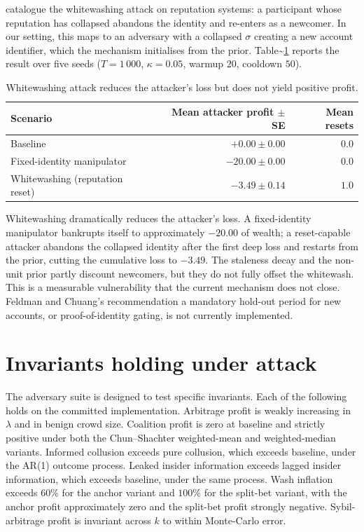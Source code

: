 \documentclass[
  11pt,
  a4paper,
  oneside]{report}
\begin{document}
\citet{feldman2004freeriding} catalogue the whitewashing attack on
reputation systems: a participant whose reputation has collapsed
abandons the identity and re-enters as a newcomer. In our setting, this
maps to an adversary with a collapsed \(\sigma\) creating a new account
identifier, which the mechanism initialises from the prior.
Table\textasciitilde{}\ref{tab:reputation-reset} reports the result over
five seeds (\(T = 1\,000\), \(\kappa = 0.05\), warmup \(20\), cooldown
\(50\)).

\begin{table}[h]
\centering
\small
\begin{tabular}{lrr}
\toprule
Scenario & Mean attacker profit $\pm$ SE & Mean resets \\
\midrule
Baseline & $+0.00 \pm 0.00$ & $0.0$ \\
Fixed-identity manipulator & $-20.00 \pm 0.00$ & $0.0$ \\
Whitewashing (reputation reset) & $-3.49 \pm 0.14$ & $1.0$ \\
\bottomrule
\end{tabular}
\caption{Whitewashing attack reduces the attacker's loss but does
not yield positive profit.}
\label{tab:reputation-reset}
\end{table}

Whitewashing dramatically reduces the attacker's loss. A fixed-identity
manipulator bankrupts itself to approximately \(-20.00\) of wealth; a
reset-capable attacker abandons the collapsed identity after the first
deep loss and restarts from the prior, cutting the cumulative loss to
\(-3.49\). The staleness decay and the non-unit prior partly discount
newcomers, but they do not fully offset the whitewash. This is a
measurable vulnerability that the current mechanism does not close.
Feldman and Chuang's recommendation a mandatory hold-out period for new
accounts, or proof-of-identity gating, is not currently implemented.

\section{Invariants holding under
attack}\label{invariants-holding-under-attack}

The adversary suite is designed to test specific invariants. Each of the
following holds on the committed implementation. Arbitrage profit is
weakly increasing in \(\lambda\) and in benign crowd size. Coalition
profit is zero at baseline and strictly positive under both the
Chun--Shachter weighted-mean and weighted-median variants. Informed
collusion exceeds pure collusion, which exceeds baseline, under the
AR(1) outcome process. Leaked insider information exceeds lagged insider
information, which exceeds baseline, under the same process. Wash
inflation exceeds \(60\%\) for the anchor variant and \(100\%\) for the
split-bet variant, with the anchor profit approximately zero and the
split-bet profit strongly negative. Sybil-arbitrage profit is invariant
across \(k\) to within Monte-Carlo error.
\end{document}
